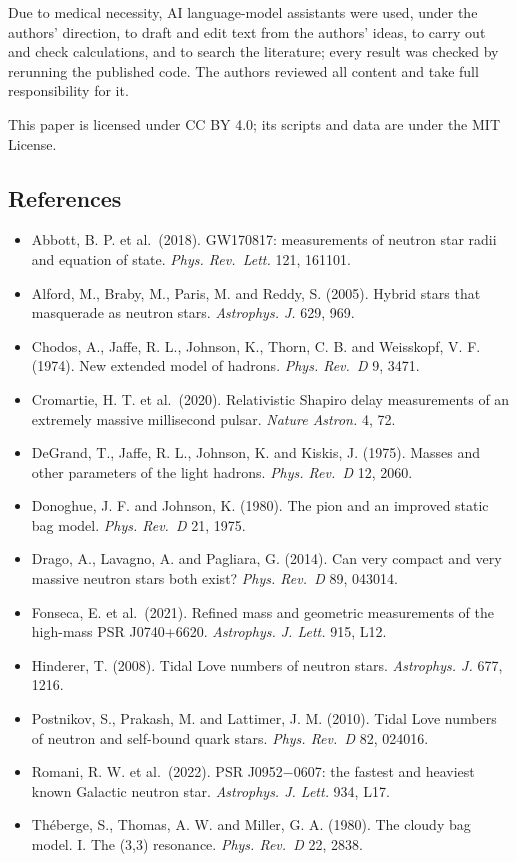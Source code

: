 \documentclass[
  11pt,
]{article}
\providecommand{\tightlist}{%
  \setlength{\itemsep}{0pt}\setlength{\parskip}{0pt}}
\begin{document}
Due to medical necessity, AI language-model assistants were used, under the authors' direction, to draft and edit text from the authors' ideas, to carry out and check calculations, and to search the literature; every result was checked by rerunning the published code. The authors reviewed all content and take full responsibility for it.

This paper is licensed under CC BY 4.0; its scripts and data are under the MIT License.

\hypertarget{references}{%
\subsection{References}\label{references}}

\begin{itemize}
\tightlist
\item
  Abbott, B. P. et al.~(2018). GW170817: measurements of neutron star radii and equation of state. \emph{Phys. Rev.~Lett.} 121, 161101.
\item
  Alford, M., Braby, M., Paris, M. and Reddy, S. (2005). Hybrid stars that masquerade as neutron stars. \emph{Astrophys. J.} 629, 969.
\item
  Chodos, A., Jaffe, R. L., Johnson, K., Thorn, C. B. and Weisskopf, V. F. (1974). New extended model of hadrons. \emph{Phys. Rev.~D} 9, 3471.
\item
  Cromartie, H. T. et al.~(2020). Relativistic Shapiro delay measurements of an extremely massive millisecond pulsar. \emph{Nature Astron.} 4, 72.
\item
  DeGrand, T., Jaffe, R. L., Johnson, K. and Kiskis, J. (1975). Masses and other parameters of the light hadrons. \emph{Phys. Rev.~D} 12, 2060.
\item
  Donoghue, J. F. and Johnson, K. (1980). The pion and an improved static bag model. \emph{Phys. Rev.~D} 21, 1975.
\item
  Drago, A., Lavagno, A. and Pagliara, G. (2014). Can very compact and very massive neutron stars both exist? \emph{Phys. Rev.~D} 89, 043014.
\item
  Fonseca, E. et al.~(2021). Refined mass and geometric measurements of the high-mass PSR J0740+6620. \emph{Astrophys. J. Lett.} 915, L12.
\item
  Hinderer, T. (2008). Tidal Love numbers of neutron stars. \emph{Astrophys. J.} 677, 1216.
\item
  Postnikov, S., Prakash, M. and Lattimer, J. M. (2010). Tidal Love numbers of neutron and self-bound quark stars. \emph{Phys. Rev.~D} 82, 024016.
\item
  Romani, R. W. et al.~(2022). PSR J0952\ensuremath{-}0607: the fastest and heaviest known Galactic neutron star. \emph{Astrophys. J. Lett.} 934, L17.
\item
  Théberge, S., Thomas, A. W. and Miller, G. A. (1980). The cloudy bag model. I. The (3,3) resonance. \emph{Phys. Rev.~D} 22, 2838.
\end{itemize}
\end{document}
